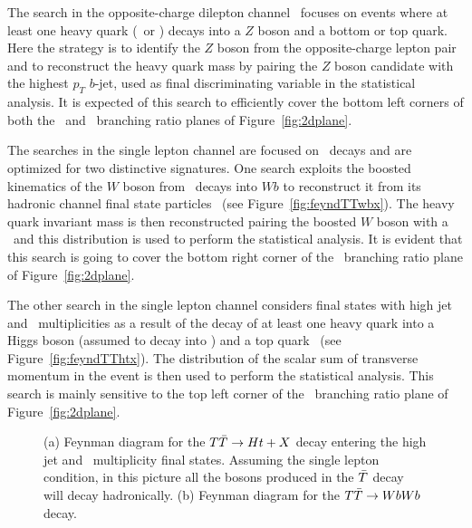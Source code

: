 The search in the opposite-charge dilepton channel~\cite{ATLAS-CONF-2013-056} 
focuses on events where at least one
heavy quark  (\B\ or \T) decays into a $Z$ boson and a bottom or top quark. 
Here the strategy is to identify the $Z$ boson from the opposite-charge lepton
pair and to reconstruct the heavy quark mass 
by pairing the $Z$ boson candidate with the highest 
$p_T$ $b$-jet, used as final discriminating variable in the statistical analysis.
It is expected of this search to efficiently cover the bottom
left corners of both the \B\ and \T\ branching ratio planes of
Figure~\ref{fig:2dplane}.


The searches in the single lepton channel are focused on \TT\ 
decays and are optimized for two distinctive signatures. One search
exploits the boosted kinematics of the $W$ boson from \T\ decays into $Wb$
to reconstruct it from its hadronic channel final state 
particles~\cite{ATLAS-CONF-2013-060} (see Figure~\ref{fig:feyndTTwbx}). The heavy quark invariant mass is 
then reconstructed pairing the boosted  $W$ boson  with a \bjet\ and this
distribution is used to perform the statistical analysis. It is evident that this
search is going to cover the bottom right corner of the \T\  branching ratio plane 
of Figure~\ref{fig:2dplane}.

The other search in the single lepton channel considers final states with high
jet and \bjet\ multiplicities as a result of the decay of at least one heavy quark
into a Higgs boson (assumed to decay into \bbbar) and a top 
quark~\cite{ATLAS-CONF-2013-018} (see Figure~\ref{fig:feyndTThtx}). The distribution
of the scalar sum of transverse momentum in the event is then used to perform the statistical 
analysis. This search is mainly sensitive to the top left corner of the \T\  
branching ratio plane of Figure~\ref{fig:2dplane}.


\begin{figure}[hbt]
\begin{center}
        \myskip\myskip
	\caption{(a) Feynman diagram for the $\TTbar\to Ht+X$
        decay entering the high jet and \bjet\ multiplicity final states.
        Assuming the single lepton condition, in this picture all the bosons 
        produced in the $\Tbar$ decay will decay hadronically.
        (b) Feynman diagram for the $\TTbar\to WbWb$ decay.\label{fig:feyndHTX}}
\end{center}
\end{figure}



